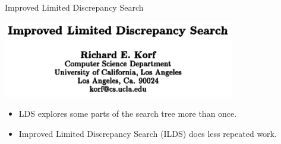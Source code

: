 \documentclass{beamer}
\begin{document}
\begin{frame}{Improved Limited Discrepancy Search}

    \centering\includegraphics*[keepaspectratio=true,scale=0.4]{ilds-paper.png}
    \vspace{1em}
    \begin{itemize}
        \item LDS explores some parts of the search tree more than once.
        \item Improved Limited Discrepancy Search (ILDS) does less repeated work.
    \end{itemize}

\end{frame}
\end{document}
